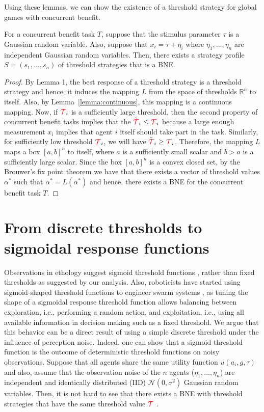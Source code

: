 \documentclass[smallextended]{svjour3}       %
\newcommand{\edit}[1]{\textcolor{red}{#1}}
\def\R{\mathbb{R}}    %
\def\td{\edit{\mathcal{T}}}   %
\begin{document}
Using these lemmas, we can show the existence of a threshold strategy for global games with concurrent benefit. 
\begin{theorem}\label{thrm:mainthrm}
For a concurrent benefit task $T$, suppose that the stimulus parameter $\tau$ is a Gaussian random variable. Also, suppose that $x_i=\tau+\eta_i$ where $\eta_1,\ldots,\eta_n$ are independent Gaussian random variables. Then, there exists a strategy profile $S=(s_1,\ldots,s_n)$ of threshold strategies that is a BNE.
\end{theorem}
\begin{proof}
By Lemma 1, the best response of a threshold strategy is a threshold strategy and hence, it induces the mapping $L$ from the space of thresholds $\R^n$ to itself. Also, by Lemma~\ref{lemma:continuous}, this mapping is a continuous mapping. Now, if $\td_i$ is a sufficiently large threshold, then the second property of concurrent benefit tasks implies that the $\tilde{\td}_i\leq \td_i$ because a large enough measurement $x_i$ implies that agent $i$ itself should take part in the task. Similarly, for sufficiently low threshold $\td_i$, we will have $\tilde{\td}_i\geq \td_i$. Therefore, the mapping $L$ maps a box $[a,b]^n$ to itself, where $a$ is a sufficiently small scalar and $b>a$ is a sufficiently large scalar. Since the box $[a,b]^n$ is a convex closed set, by the Brouwer's fix point theorem \citep{Border1990} we have that there exists a vector of threshold values $\alpha^*$ such that $\alpha^*=L(\alpha^*)$ and hence, there exists a BNE for the concurrent benefit task $T$.
\end{proof}

\section{From discrete thresholds to sigmoidal response functions}\label{sec:continuous}
Observations in ethology suggest sigmoid threshold functions \citep{Bonabeau1996}, rather than fixed thresholds as suggested by our analysis. Also, roboticists have started using sigmoid-shaped threshold functions to engineer swarm systems \citep{Bonabeau1996,Theraulaz1998,Krieger2000}, as tuning the shape of a sigmoidal response threshold function allows balancing between exploration, i.e., performing a random action, and exploitation, i.e., using all available information in decision making such as a fixed threshold. 
We argue that this behavior can be a direct result of using a simple discrete threshold under the influence of perception noise. Indeed, one can show that a sigmoid threshold function is the outcome of deterministic threshold functions on noisy observations. Suppose that all  agents share the same utility function $u(a_i,g,\tau)$ and also, assume that the observation noise of the $n$ agents ($\eta_1,\ldots,\eta_n$) are independent and identically distributed (IID) $\mathcal{N}(0,\sigma^2)$ Gaussian random variables. Then, it is not hard to see that there exists a BNE with threshold strategies that have the same threshold value $\td$ \citep{Morris2000}.
\end{document}
